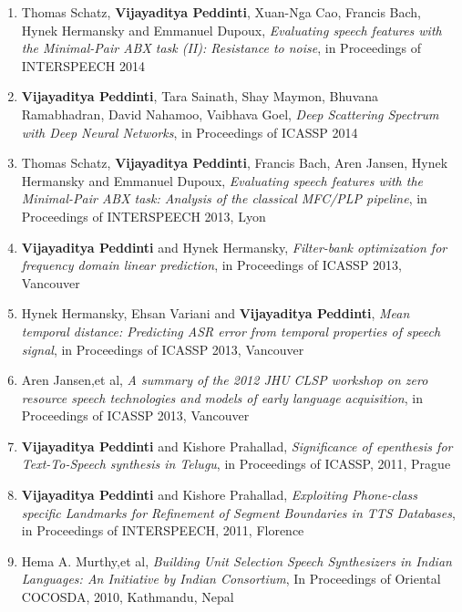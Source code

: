 \documentclass[margin,line,pifont,palatino,courier]{res}
\begin{document}
\begin{resume}
\begin{enumerate}
\item Thomas Schatz, \textbf{Vijayaditya Peddinti}, Xuan-Nga Cao, Francis Bach, Hynek Hermansky and Emmanuel Dupoux,
\textit{Evaluating speech features with the Minimal-Pair ABX task (II): Resistance to noise}, in Proceedings of INTERSPEECH 2014

\item \textbf{Vijayaditya Peddinti}, Tara Sainath, Shay Maymon, Bhuvana Ramabhadran, David Nahamoo, Vaibhava Goel,
\textit{Deep Scattering Spectrum with Deep Neural Networks}, in Proceedings of ICASSP 2014

\item Thomas Schatz, \textbf{Vijayaditya Peddinti}, Francis Bach, Aren Jansen, Hynek Hermansky and Emmanuel Dupoux,
\textit{Evaluating speech features with the Minimal-Pair ABX task: Analysis of the classical MFC/PLP pipeline}, in Proceedings of INTERSPEECH 2013, Lyon

\item \textbf{Vijayaditya Peddinti} and Hynek Hermansky,
\textit{Filter-bank optimization for frequency domain linear prediction}, in Proceedings of ICASSP 2013, Vancouver

\item Hynek Hermansky, Ehsan Variani and \textbf{Vijayaditya Peddinti},
\textit{Mean temporal distance: Predicting ASR error from temporal properties of speech signal}, in Proceedings of ICASSP 2013, Vancouver

\item Aren Jansen,et al, 
\textit{A summary of the 2012 JHU CLSP workshop on zero resource speech technologies and models of early language acquisition}, in Proceedings of ICASSP 2013, Vancouver


\item \textbf{Vijayaditya Peddinti} and Kishore Prahallad,
\textit{Significance of epenthesis for Text-To-Speech synthesis in Telugu}, in Proceedings of ICASSP, 2011, Prague

\item \textbf{Vijayaditya Peddinti} and Kishore Prahallad,
\textit{Exploiting Phone-class specific Landmarks for Refinement of Segment Boundaries in TTS Databases}, in Proceedings of INTERSPEECH, 2011, Florence

\item Hema A. Murthy,et al, 
\textit{Building Unit Selection Speech Synthesizers in Indian Languages: An Initiative by Indian Consortium}, In Proceedings of Oriental COCOSDA, 2010, Kathmandu, Nepal


\end{enumerate}
\end{resume}
\end{document}
